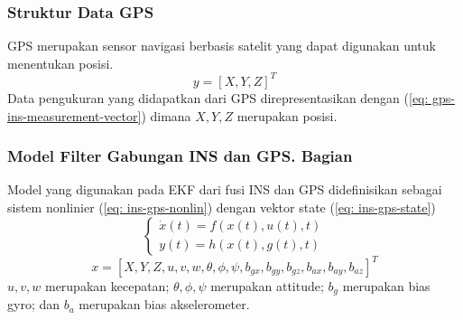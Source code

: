 \begin{frame}
    \frametitle{Struktur Data GPS}

    GPS merupakan sensor navigasi berbasis satelit yang dapat digunakan untuk menentukan posisi.
    \begin{equation}
        y=[X, Y, Z]^{T}
        \label{eq: gps-ins-measurement-vector}
    \end{equation}
    Data pengukuran yang didapatkan dari GPS direpresentasikan dengan (\ref{eq: gps-ins-measurement-vector}) dimana $X, Y, Z$ merupakan posisi.
\end{frame}


\begin{frame}[allowframebreaks]
    \frametitle{Model Filter Gabungan INS dan GPS. Bagian}

    Model yang digunakan pada EKF dari fusi INS dan GPS didefinisikan sebagai sistem nonlinier (\ref{eq: ins-gps-nonlin}) dengan vektor state (\ref{eq: ins-gps-state})
    \begin{equation}
        \left\{\begin{array}{l}
        \dot{x}(t)=f(x(t), u(t), t) \\
        y(t)=h(x(t), g(t), t)
        \end{array}\right.
        \label{eq: ins-gps-nonlin}
    \end{equation}
    \begin{equation}
        x=\left[X, Y, Z, u, v, w, \theta, \phi, \psi, b_{g x}, b_{g y}, b_{g z}, b_{a x}, b_{a y}, b_{a z}\right]^{T}
        \label{eq: ins-gps-state}
    \end{equation}
    $u, v, w$ merupakan kecepatan; $\theta, \phi, \psi$ merupakan attitude; $b_{g}$ merupakan bias gyro; dan $b_{a}$ merupakan bias akselerometer.

    \pagebreak


\end{frame}
